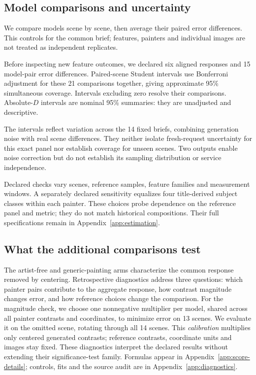 \documentclass[11pt]{article}
\begin{document}
\subsection{Model comparisons and uncertainty}
We compare models scene by scene, then average their paired error differences.
This controls for the common brief; features, painters and individual images
are not treated as independent replicates.

Before inspecting new feature outcomes, we declared six aligned responses and
15 model-pair error differences. Paired-scene Student intervals use Bonferroni
adjustment for these 21 comparisons together, giving approximate 95\%
simultaneous coverage. Intervals excluding zero resolve their comparisons.
Absolute-$D$ intervals are nominal 95\% summaries: they are unadjusted and descriptive.

The intervals reflect variation across the 14 fixed briefs, combining generation
noise with real scene differences. They neither isolate fresh-request uncertainty for this exact
panel nor establish coverage for unseen scenes. Two outputs enable noise
correction but do not establish its sampling distribution or service independence.

Declared checks vary scenes, reference samples, feature families and measurement
windows. A separately declared sensitivity equalizes four title-derived subject
classes within each painter. These choices probe dependence on the reference
panel and metric; they do not match historical compositions. Their full
specifications remain in Appendix~\ref{app:estimation}.

\subsection{What the additional comparisons test}\label{sec:diagnostics}
The artist-free and generic-painting arms characterize the common response removed
by centering.
Retrospective diagnostics address three questions: which painter pairs contribute
to the aggregate response, how contrast magnitude changes error, and how reference
choices change the comparison. For the magnitude check, we choose one
nonnegative multiplier per model, shared across all painter contrasts and
coordinates, to minimize error on 13 scenes.
We evaluate it on the omitted scene, rotating through all 14 scenes.
This \emph{calibration} multiplies only centered generated contrasts; reference
contrasts, coordinate units and images stay fixed. These diagnostics
interpret the declared results without extending their significance-test family.
Formulas appear in Appendix~\ref{app:score-details}; controls, fits and the source
audit are in Appendix~\ref{app:diagnostics}.
\end{document}
